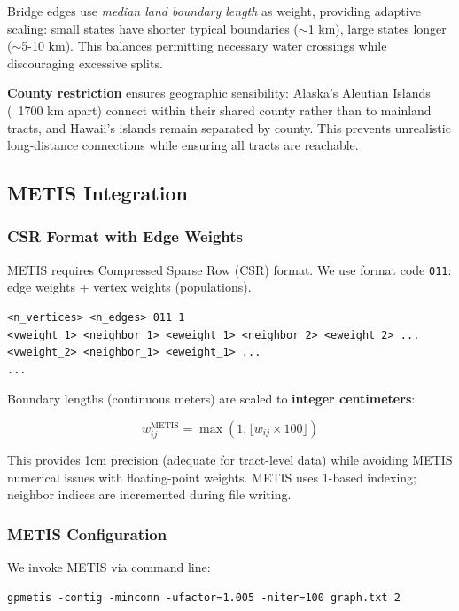 Bridge edges use \textit{median land boundary length} as weight, providing adaptive scaling: small states have shorter typical boundaries ($\sim$1 km), large states longer ($\sim$5-10 km). This balances permitting necessary water crossings while discouraging excessive splits.

\textbf{County restriction} ensures geographic sensibility: Alaska's Aleutian Islands (~1700 km apart) connect within their shared county rather than to mainland tracts, and Hawaii's islands remain separated by county. This prevents unrealistic long-distance connections while ensuring all tracts are reachable.

\subsection{METIS Integration}

\subsubsection{CSR Format with Edge Weights}

METIS requires Compressed Sparse Row (CSR) format. We use format code \texttt{011}: edge weights + vertex weights (populations).

\begin{verbatim}
<n_vertices> <n_edges> 011 1
<vweight_1> <neighbor_1> <eweight_1> <neighbor_2> <eweight_2> ...
<vweight_2> <neighbor_1> <eweight_1> ...
...
\end{verbatim}

Boundary lengths (continuous meters) are scaled to \textbf{integer centimeters}:

\begin{equation}
    w_{ij}^{\text{METIS}} = \max(1, \lfloor w_{ij} \times 100 \rfloor)
\end{equation}

This provides 1cm precision (adequate for tract-level data) while avoiding METIS numerical issues with floating-point weights. METIS uses 1-based indexing; neighbor indices are incremented during file writing.

\subsubsection{METIS Configuration}

We invoke METIS via command line:

\begin{verbatim}
gpmetis -contig -minconn -ufactor=1.005 -niter=100 graph.txt 2
\end{verbatim}

